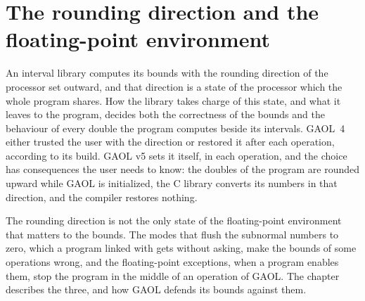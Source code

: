 
\chapter{The rounding direction and the floating-point environment}
\label{chap:rounding}

An interval library computes its bounds with the rounding direction of the
processor set outward, and that direction is a state of the processor which
the whole program shares. How the library takes charge of this state, and
what it leaves to the program, decides both the correctness of the bounds and
the behaviour of every double the program computes beside its intervals. GAOL~4 either trusted the user with the direction or restored it after each operation, according to its build.
GAOL v5 sets it itself, in each operation,
and the choice has consequences the user needs to know: the doubles of the
program are rounded upward while GAOL is initialized, the C library converts
its numbers in that direction, and the compiler restores nothing.

\medskip
The rounding direction is not the only state of the floating-point
environment that matters to the bounds. The modes that flush the subnormal
numbers to zero, which a program linked with  gets without
asking, make the bounds of some operations wrong, and the floating-point
exceptions, when a program enables them, stop the program in the middle of an
operation of GAOL. The chapter describes the three, and how GAOL defends its
bounds against them.

